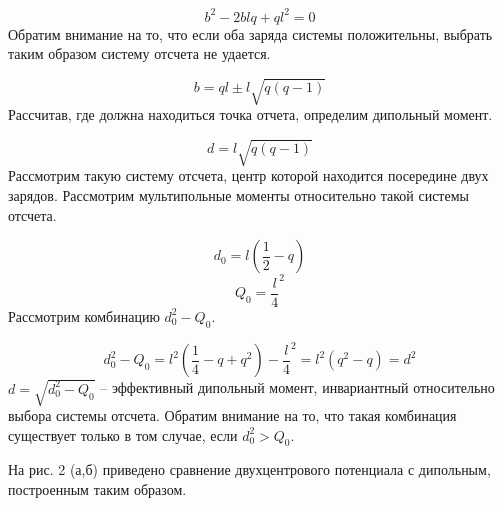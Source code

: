 \begin{equation*}
b^2-2\mathit{blq}+ql^2=0
\end{equation*}
Обратим внимание на то, что если оба заряда системы положительны, выбрать таким образом систему отсчета не удается.

\begin{equation*}
b=\mathit{ql}\pm l\sqrt{q\left(q-1\right)}
\end{equation*}
Рассчитав, где должна находиться точка отчета, определим дипольный момент.

\begin{equation*}
d=l\sqrt{q\left(q-1\right)}
\end{equation*}
Рассмотрим такую систему отсчета, центр которой находится посередине двух зарядов. Рассмотрим мультипольные моменты относительно такой системы отсчета.

\begin{equation*}
d_0=l\left(\frac 1 2-q\right)
\end{equation*}
\begin{equation*}
Q_0=\frac l 4^2
\end{equation*}
Рассмотрим комбинацию  $d_0^2-Q_0$.

\begin{equation*}
d_0^2-Q_0=l^2\left(\frac 1 4-q+q^2\right)-\frac l 4^2=l^2\left(q^2-q\right)=d^2
\end{equation*}
 $d=\sqrt{d_0^2-Q_0}$ -- эффективный дипольный момент, инвариантный относительно выбора системы отсчета. Обратим внимание на то, что такая комбинация существует только в том
случае, если  $d_0^2>Q_0$.

На рис. 2 (а,б) приведено сравнение двухцентрового потенциала с дипольным, построенным таким образом.

